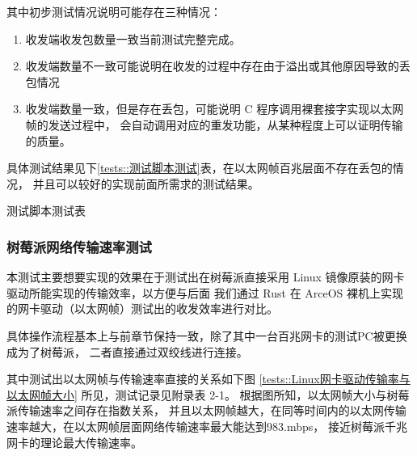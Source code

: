     其中初步测试情况说明可能存在三种情况：

    \begin{enumerate}
        \item 收发端收发包数量一致当前测试完整完成。
        \item 收发端数量不一致可能说明在收发的过程中存在由于溢出或其他原因导致的丢包情况
        \item 收发端数量一致，但是存在丢包，可能说明 C 程序调用裸套接字实现以太网帧的发送过程中，
        会自动调用对应的重发功能，从某种程度上可以证明传输的质量。
    \end{enumerate}

    具体测试结果见下\ref{tests::测试脚本测试}表，在以太网帧百兆层面不存在丢包的情况，
    并且可以较好的实现前面所需求的测试结果。

    \begin{table}[ht]
    \centering
    \label{tests::测试脚本测试}
    \caption{测试脚本测试表}
    \end{table}

    \subsubsection{树莓派网络传输速率测试}

    本测试主要想要实现的效果在于测试出在树莓派直接采用 Linux 镜像原装的网卡驱动所能实现的传输效率，以方便与后面
    我们通过 Rust 在 ArceOS 裸机上实现的网卡驱动（以太网帧）测试出的收发效率进行对比。

    具体操作流程基本上与前章节保持一致，除了其中一台百兆网卡的测试PC被更换成为了树莓派，
    二者直接通过双绞线进行连接。
    
    其中测试出以太网帧与传输速率直接的关系如下图 \ref{tests::Linux网卡驱动传输率与以太网帧大小} 所见，测试记录见附录表 2-1。
    根据图所知，以太网帧大小与树莓派传输速率之间存在指数关系，
    并且以太网帧越大，在同等时间内的以太网传输速率越大，在以太网帧层面网络传输速率最大能达到983.mbps，
    接近树莓派千兆网卡的理论最大传输速率。

